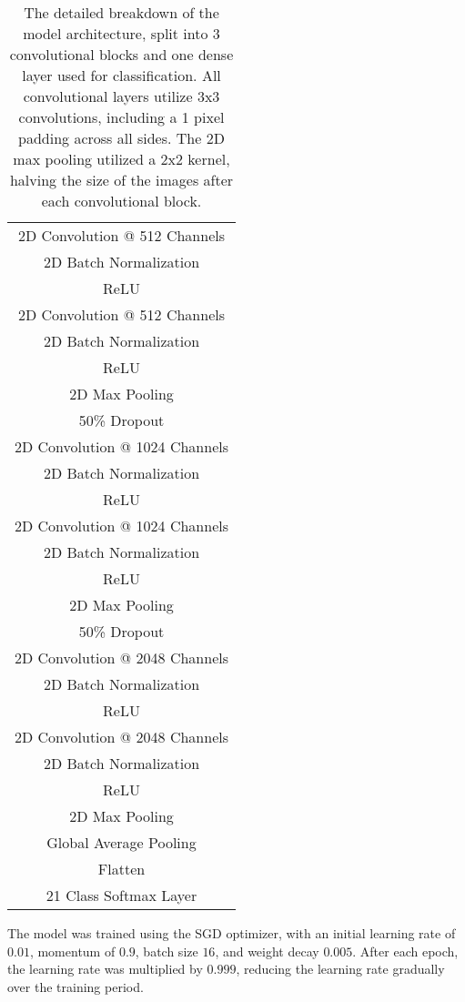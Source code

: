 \begin{table}[ht]
	\centering
	\begin{tabular}{||c||}
		\hline
		2D Convolution @ 512 Channels \\
		2D Batch Normalization \\
		ReLU \\
		2D Convolution @ 512 Channels \\
		2D Batch Normalization \\
		ReLU \\
		2D Max Pooling\\
		\hline\hline
		50\% Dropout \\
		2D Convolution @ 1024 Channels \\
		2D Batch Normalization \\
		ReLU \\
		2D Convolution @ 1024 Channels \\
		2D Batch Normalization \\
		ReLU \\
		2D Max Pooling\\
		\hline\hline
		50\% Dropout \\
		2D Convolution @ 2048 Channels \\
		2D Batch Normalization \\
		ReLU \\
		2D Convolution @ 2048 Channels \\
		2D Batch Normalization \\
		ReLU \\
		2D Max Pooling\\
		\hline\hline
		Global Average Pooling \\
		Flatten \\
		21 Class Softmax Layer \\
		\hline
	\end{tabular}
	\caption{The detailed breakdown of the model architecture, split into 3 convolutional blocks and one dense layer used for classification. All convolutional layers utilize 3x3 convolutions, including a 1 pixel padding across all sides. The 2D max pooling utilized a 2x2 kernel, halving the size of the images after each convolutional block.}
	\label{tab:detailed-model}
\end{table}

The model was trained using the SGD optimizer, with an initial learning rate of $0.01$, momentum of $0.9$, batch size $16$, and weight decay $0.005$. After each epoch, the learning rate was multiplied by $0.999$, reducing the learning rate gradually over the training period.